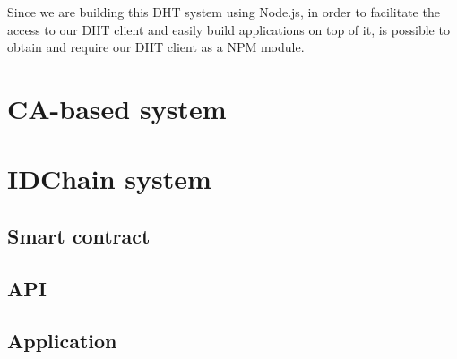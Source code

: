 Since we are building this DHT system using Node.js, in order to facilitate the access to our DHT client and easily build applications on top of it, is possible to obtain and require our DHT client as a \ac{NPM} module.

\section{CA-based system}



\section{IDChain system}\label{implementation:idchain}

\subsection{Smart contract}

\subsection{API}

\subsection{Application}
